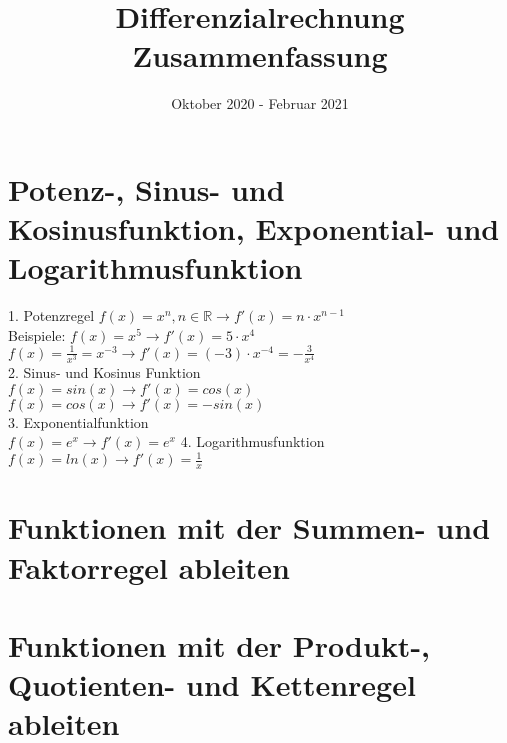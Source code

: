 \documentclass[a4paper]{article}
\title{Differenzialrechnung Zusammenfassung}
\date{Oktober 2020 - Februar 2021}
\begin{document}
\maketitle
\tableofcontents

\section{Potenz-, Sinus- und Kosinusfunktion, Exponential- und Logarithmusfunktion}
1. Potenzregel 
$ f(x) = x^n, n \in \mathds{R} \longrightarrow f'(x) = n \cdot x^{n-1} $\\
Beispiele: 
$f(x) = x^5 \longrightarrow f'(x) = 5 \cdot x^4$ \\
$f(x) = \frac{1}{x^{3}} = x^{-3} \longrightarrow f'(x) = (-3) \cdot x^{-4} = -\frac{3}{x^{4}} $ \\
2. Sinus- und Kosinus Funktion \\
$f(x) = sin(x) \longrightarrow f'(x) = cos(x) $ \\
$f(x) = cos(x) \longrightarrow f'(x) = -sin(x) $ \\
3. Exponentialfunktion \\
$f(x) = e^x \longrightarrow f'(x)=e^x$
4. Logarithmusfunktion \\
$ f(x) = ln(x) \longrightarrow f'(x) = \frac{1}{x}$
\section{Funktionen mit der Summen- und Faktorregel ableiten}

\section{Funktionen mit der Produkt-, Quotienten- und Kettenregel ableiten}
\end{document}
